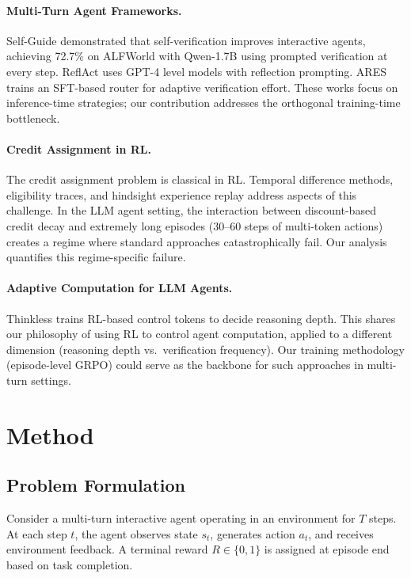 \documentclass[11pt]{article}
\begin{document}
\paragraph{Multi-Turn Agent Frameworks.}
Self-Guide demonstrated that self-verification improves interactive agents, achieving 72.7\% on ALFWorld with Qwen-1.7B using prompted verification at every step. ReflAct uses GPT-4 level models with reflection prompting. ARES trains an SFT-based router for adaptive verification effort. These works focus on inference-time strategies; our contribution addresses the orthogonal training-time bottleneck.

\paragraph{Credit Assignment in RL.}
The credit assignment problem is classical in RL. Temporal difference methods, eligibility traces, and hindsight experience replay address aspects of this challenge. In the LLM agent setting, the interaction between discount-based credit decay and extremely long episodes (30--60 steps of multi-token actions) creates a regime where standard approaches catastrophically fail. Our analysis quantifies this regime-specific failure.

\paragraph{Adaptive Computation for LLM Agents.}
Thinkless trains RL-based control tokens to decide reasoning depth. This shares our philosophy of using RL to control agent computation, applied to a different dimension (reasoning depth vs.\ verification frequency). Our training methodology (episode-level GRPO) could serve as the backbone for such approaches in multi-turn settings.

\section{Method}

\subsection{Problem Formulation}

Consider a multi-turn interactive agent operating in an environment for $T$ steps. At each step $t$, the agent observes state $s_t$, generates action $a_t$, and receives environment feedback. A terminal reward $R \in \{0, 1\}$ is assigned at episode end based on task completion.
\end{document}
